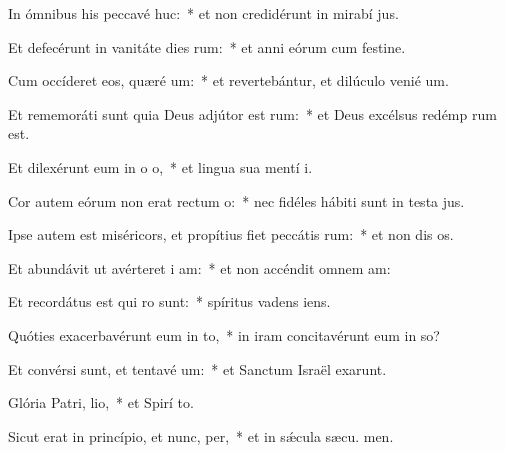 \item In ómnibus his peccavé huc:~* et non credidérunt in mirabí jus.
\item Et defecérunt in vanitáte dies rum:~* et anni eórum cum festine.
\item Cum occíderet eos, quæré um:~* et revertebántur, et dilúculo venié  um.
\item Et rememoráti sunt quia Deus adjútor est rum:~* et Deus excélsus redémp rum est.
\item Et dilexérunt eum in o o,~* et lingua sua mentí  i.
\item Cor autem eórum non erat rectum  o:~* nec fidéles hábiti sunt in testa jus.
\item Ipse autem est miséricors, et propítius fiet peccátis rum:~* et non dis os.
\item Et abundávit ut avérteret i am:~* et non accéndit omnem  am:
\item Et recordátus est qui ro sunt:~* spíritus vadens   iens.
\item Quóties exacerbavérunt eum in to,~* in iram concitavérunt eum in so?
\item Et convérsi sunt, et tentavé um:~* et Sanctum Israël exarunt.
\item Glória Patri,  lio,~* et Spirí to.
\item Sicut erat in princípio, et nunc,  per,~* et in sǽcula sæcu. men.
